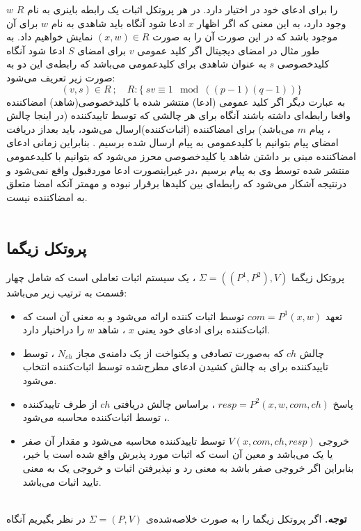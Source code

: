 $w$
را برای ادعای خود در اختیار دارد. در هر پروتکل اثبات یک رابطه باینری به نام 
$R$
وجود دارد، به این معنی که اگر اظهار
$x$
ادعا ‌شود آنگاه باید شاهدی
به نام 
$w$
برای آن موجود باشد که در این صورت آن را به صورت 
$(x,w) \in R $
نمایش خواهیم داد. به طور مثال در امضای دیجیتال اگر کلید عمومی 
$v$
برای امضای
$S$
ادعا شود آنگاه کلیدخصوصی
$s$
به عنوان شاهدی برای کلیدعمومی می‌باشد که رابطه‌ی این دو به صورت زیر تعریف می‌شود:
$$(v,s) \in R ~ ; \quad R :\{ ~ ‌sv \equiv 1  \mod ( (p-1)(q-1) )  \} $$
به عبارت دیگر اگر کلید عمومی (ادعا) منتشر شده با کلیدخصوصی(شاهد)  امضاکننده واقعا رابطه‌ای داشته باشند آنگاه برای هر چالشی که توسط تاییدکننده (در اینجا چالش ، پیام 
$m$
می‌باشد) برای امضاکننده (اثبات‌کننده)ارسال می‌شود، باید بعداز دریافت امضای پیام بتوانیم با کلیدعمومی به پیام ارسال شده برسیم . بنابراین زمانی ادعای امضاکننده مبنی بر داشتن شاهد یا کلیدخصوصی محرز می‌شود که بتوانیم با کلیدعمومی منتشر شده توسط وی به پیام برسیم ،در غیراینصورت ادعا موردقبول واقع نمی‌شود و درنتیجه آشکار می‌شود که رابطه‌ای بین کلیدها برقرار نبوده و مهمتر آنکه امضا متعلق به امضاکننده نیست.
\\
\\
\subsection{پروتکل زیگما}\label{sigma}

 پروتکل زیگما 
$\Sigma = ((P^1,P^2),V)$
، یک سیستم اثبات تعاملی است که شامل چهار قسمت به ترتیب زیر می‌باشد:
\begin{itemize}
\item 
 تعهد
$com = P^1(x,w)$
 توسط اثبات کننده ارائه می‌شود و به معنی آن است که اثبات‌کننده برای ادعای خود یعنی
 $x$
 ، شاهد 
 $w$
 را دراخنیار دارد.
\item 
 چالش 
$ch$
که به‌صورت  تصادفی و یکنواخت از یک دامنه‌ی مجاز
$N_{ch}$
، توسط تاییدکننده برای به چالش کشیدن ادعای مطرح‌شده توسط اثبات‌کننده انتخاب می‌شود. 
\item 
 پاسخ 
$resp = P^2(x,w,com,ch)$
 ، براساس چالش دریافتی  
$ch$
از طرف تایید‌کننده ، توسط اثبات‌کننده محاسبه می‌شود.
\item
خروجی 
$V(x,com,ch,resp)$
 توسط تاییدکننده محاسبه می‌شود و مقدار آن  صفر یا یک می‌باشد و معین آن است که  اثبات مورد پذیرش  واقع شده است یا خیر، بنابراین اگر خروجی صفر باشد به معنی رد و نپذیرفتن اثبات و خروجی یک به معنی تایید اثبات می‌باشد. 
	
\end{itemize}~
\\
\textbf{توجه.}
اگر پروتکل زیگما را به صورت خلاصه‌شده‌ی
$\Sigma = (P,V)$
در نظر بگیریم آنگاه

